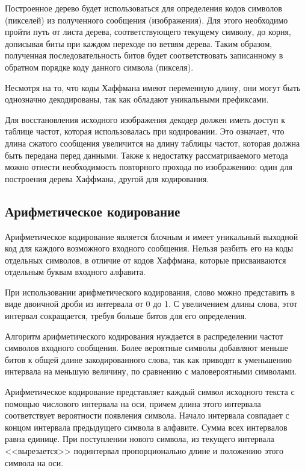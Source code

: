 Построенное дерево будет использоваться для определения кодов символов (пикселей) из полученного сообщения (изображения).
Для этого необходимо пройти путь от листа дерева, соответствующего текущему символу, до корня, дописывая биты при каждом переходе по ветвям дерева. Таким образом, полученная последовательность битов будет соответствовать записанному в обратном порядке коду данного символа (пикселя).

Несмотря на то, что коды Хаффмана имеют переменную длину, они могут быть однозначно декодированы, так как обладают уникальными префиксами. 

Для восстановления исходного изображения декодер должен иметь доступ к таблице частот, которая использовалась при кодировании. Это означает, что длина сжатого сообщения увеличится на длину таблицы частот, которая должна быть передана перед данными. Также к недостатку рассматриваемого метода можно отнести необходимость повторного прохода по изображению: один для построения дерева Хаффмана, другой для кодирования.

\subsection{Арифметическое кодирование}

Арифметическое кодирование является блочным и имеет уникальный выходной код для каждого возможного входного сообщения. Нельзя разбить его на коды отдельных символов, в отличие от кодов Хаффмана, которые присваиваются отдельным буквам входного алфавита.

При использовании арифметического кодирования, слово можно представить в виде двоичной дроби из интервала от 0 до 1. С увеличением длины слова, этот интервал сокращается, требуя больше битов для его определения. 

Алгоритм арифметического кодирования нуждается в  распределении частот символов входного сообщения. Более вероятные символы добавляют меньше битов к общей длине закодированного слова, так как приводят к уменьшению интервала на меньшую величину, по сравнению с маловероятными символами. 

Арифметическое кодирование представляет каждый символ исходного текста с помощью числового интервала на оси, причем длина этого интервала соответствует вероятности появления символа. Начало интервала совпадает с концом интервала предыдущего символа в алфавите. Сумма всех интервалов равна единице. При поступлении нового символа, из текущего интервала <<вырезается>> подинтервал пропорционально длине и положению этого символа на оси.

